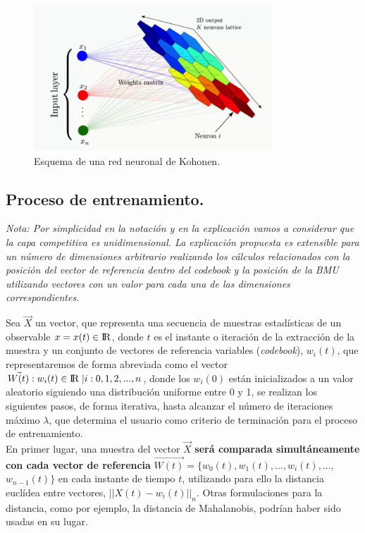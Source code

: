 \begin{figure}
\centering
\includegraphics[width=0.8\textwidth]{imagenes/arquitectura_som.png}

\caption{Esquema de una red neuronal de Kohonen.}
\end{figure}

\subsection{Proceso de entrenamiento.}
\textit{Nota: Por simplicidad en la notación y en la explicación vamos a considerar que la capa competitiva es unidimensional. La explicación propuesta es extensible para un número de dimensiones arbitrario realizando los cálculos relacionados con la posición del vector de referencia dentro del codebook y la posición de la BMU utilizando vectores con un valor para cada una de las dimensiones correspondientes.\\}

Sea $\vec{X}$ un vector, que representa una secuencia de muestras estadísticas de un observable $x=x(t) \in {\rm I\!R}$, donde $t$ es el instante o iteración de la extracción de la muestra y un conjunto de vectores de referencia variables (\textit{codebook}), $w_i(t)$, que representaremos de forma abreviada como el vector $\vec{W(t)}: w_i(t) \in {\rm I\!R} \; | i: 0, 1, 2, ..., n $, donde los $w_i(0)$ están inicializados a un valor aleatorio siguiendo una distribución uniforme entre 0 y 1, se realizan los siguientes pasos, de forma iterativa, hasta alcanzar el número de iteraciones máximo $\lambda$, que determina el usuario como criterio de terminación para el proceso de entrenamiento.\\

En primer lugar, una muestra del vector $\vec{X}$ \textbf{será comparada simultáneamente con cada vector de referencia} $\vec{W(t)} = \{w_0(t), w_1(t), ..., w_i(t), ...,$ ${w_{n-1}}(t)\}$ en cada instante de tiempo $t$, utilizando para ello la distancia euclídea entre vectores, $||{X(t)-w_i(t)}||_n$. Otras formulaciones para la distancia, como por ejemplo, la distancia de Mahalanobis, podrían haber sido usadas en su lugar. \\

